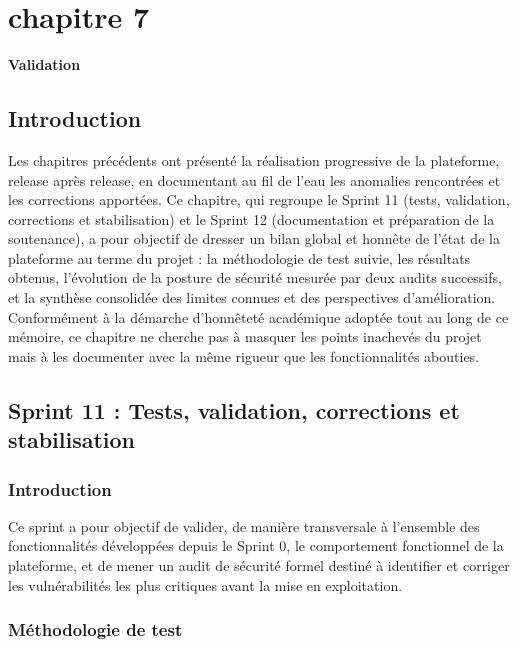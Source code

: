 \chapter*{chapitre 7}

\textbf{\Huge Validation}

\setcounter{chapter}{7}
\setcounter{section}{0}

\section{Introduction}

Les chapitres précédents ont présenté la réalisation progressive de la plateforme, release après release, en documentant au fil de l'eau les anomalies rencontrées et les corrections apportées. Ce chapitre, qui regroupe le Sprint 11 (tests, validation, corrections et stabilisation) et le Sprint 12 (documentation et préparation de la soutenance), a pour objectif de dresser un bilan global et honnête de l'état de la plateforme au terme du projet : la méthodologie de test suivie, les résultats obtenus, l'évolution de la posture de sécurité mesurée par deux audits successifs, et la synthèse consolidée des limites connues et des perspectives d'amélioration. Conformément à la démarche d'honnêteté académique adoptée tout au long de ce mémoire, ce chapitre ne cherche pas à masquer les points inachevés du projet mais à les documenter avec la même rigueur que les fonctionnalités abouties.


\section{Sprint 11 : Tests, validation, corrections et stabilisation}

\subsection{Introduction}

Ce sprint a pour objectif de valider, de manière transversale à l'ensemble des fonctionnalités développées depuis le Sprint 0, le comportement fonctionnel de la plateforme, et de mener un audit de sécurité formel destiné à identifier et corriger les vulnérabilités les plus critiques avant la mise en exploitation.

\subsection{Méthodologie de test}

